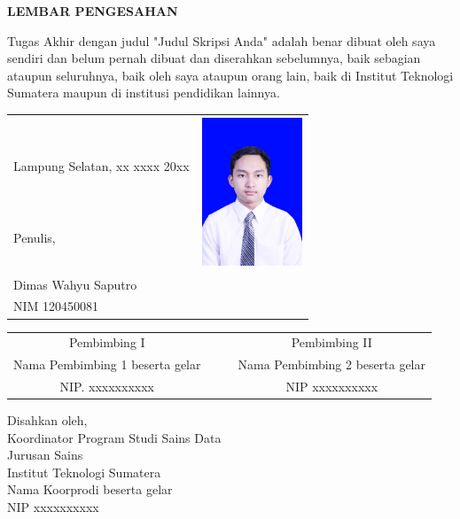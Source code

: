 \centerline{\large\bfseries LEMBAR PENGESAHAN}
{}
\vspace*{40pt}

Tugas Akhir dengan judul "Judul Skripsi Anda" adalah benar dibuat oleh saya sendiri dan belum pernah dibuat dan diserahkan sebelumnya, baik sebagian ataupun seluruhnya, baik oleh saya ataupun orang lain, baik di Institut Teknologi Sumatera maupun di institusi pendidikan lainnya.

\begin{table}[htbp]
	\begin{tabular}{p{9.8cm}p{4cm}}
		& \multirow{3}{*}{{\includegraphics[width=3cm,height=4.5cm]{pasfoto.jpg}}} \\
		{Lampung Selatan, xx xxxx 20xx} & \\
		Penulis, & \\[8ex]
		Dimas Wahyu Saputro   & \\
		{NIM 120450081} & \\[9ex]
	\end{tabular}
\end{table}

\begin{center}
	\begin{tabularx}{\textwidth}{c@{}lXc@{}}%
		Pembimbing I & & & Pembimbing II \\ [9ex]
		Nama Pembimbing 1 beserta gelar & & & Nama Pembimbing 2 beserta gelar \\ 
		NIP. xxxxxxxxxx & & & NIP xxxxxxxxxx
	\end{tabularx}
\end{center}

\begin{center}			
	{Disahkan oleh,} 	\\
	{Koordinator Program Studi Sains Data}\\
	{Jurusan Sains} \\
	Institut Teknologi Sumatera\\[9ex]	
	{Nama Koorprodi beserta gelar}\\
	{NIP xxxxxxxxxx}	
\end{center}




